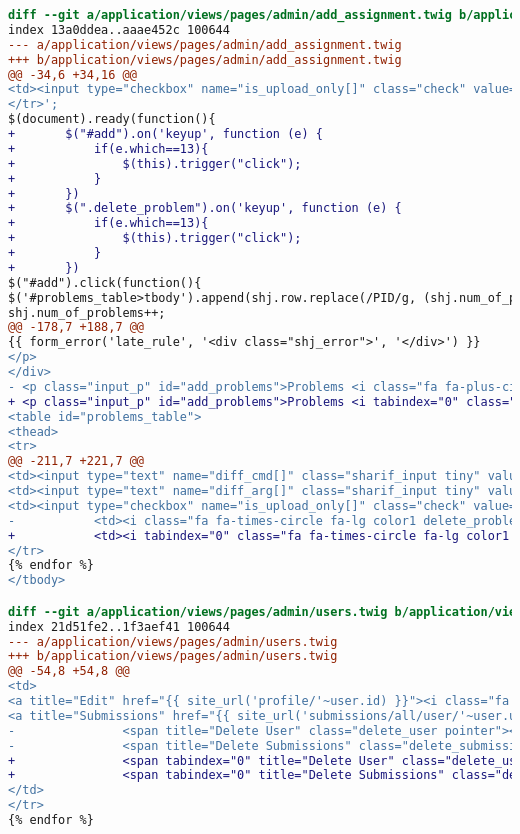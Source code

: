 \begin{itemize}
\begin{lstlisting}[language=diff, caption=Perubahan untuk mematuhi kriteria 2.1.1, label=lst_2.1.1, basicstyle=\ttfamily, frame=single,
columns=fullflexible, keepspaces=true, breaklines=true]
diff --git a/application/views/pages/admin/add_assignment.twig b/application/views/pages/admin/add_assignment.twig
index 13a0ddea..aaae452c 100644
--- a/application/views/pages/admin/add_assignment.twig
+++ b/application/views/pages/admin/add_assignment.twig
@@ -34,6 +34,16 @@
<td><input type="checkbox" name="is_upload_only[]" class="check" value="PID"/><td><i class="fa fa-times-circle fa-lg color1 delete_problem pointer"></i></td></td>\
</tr>';
$(document).ready(function(){
+ 		$("#add").on('keyup', function (e) {
+ 			if(e.which==13){
+ 				$(this).trigger("click");
+ 			}
+ 		})
+ 		$(".delete_problem").on('keyup', function (e) {
+ 			if(e.which==13){
+ 				$(this).trigger("click");
+ 			}
+ 		})
$("#add").click(function(){
$('#problems_table>tbody').append(shj.row.replace(/PID/g, (shj.num_of_problems+1)));
shj.num_of_problems++;
@@ -178,7 +188,7 @@
{{ form_error('late_rule', '<div class="shj_error">', '</div>') }}
</p>
</div>
- <p class="input_p" id="add_problems">Problems <i class="fa fa-plus-circle fa-lg color11 pointer" id="add"></i>
+ <p class="input_p" id="add_problems">Problems <i tabindex="0" class="fa fa-plus-circle fa-lg color11 pointer" id="add"></i>
<table id="problems_table">
<thead>
<tr>
@@ -211,7 +221,7 @@
<td><input type="text" name="diff_cmd[]" class="sharif_input tiny" value="{{ problem.diff_cmd }}"/></td>
<td><input type="text" name="diff_arg[]" class="sharif_input tiny" value="{{ problem.diff_arg }}"/></td>
<td><input type="checkbox" name="is_upload_only[]" class="check" value="{{ problem.id }}" {{ problem.is_upload_only ? 'checked' }}/></td>
- 			<td><i class="fa fa-times-circle fa-lg color1 delete_problem pointer"></i></td>
+ 			<td><i tabindex="0" class="fa fa-times-circle fa-lg color1 delete_problem pointer"></i></td>
</tr>
{% endfor %}
</tbody>

diff --git a/application/views/pages/admin/users.twig b/application/views/pages/admin/users.twig
index 21d51fe2..1f3aef41 100644
--- a/application/views/pages/admin/users.twig
+++ b/application/views/pages/admin/users.twig
@@ -54,8 +54,8 @@
<td>
<a title="Edit" href="{{ site_url('profile/'~user.id) }}"><i class="fa fa-pencil fa-lg color9"></i></a>
<a title="Submissions" href="{{ site_url('submissions/all/user/'~user.username) }}"><i class="fa fa-bars fa-lg color12"></i></a>
- 				<span title="Delete User" class="delete_user pointer"><i title="Delete User" class="fa fa-times fa-lg color2"></i></span>
- 				<span title="Delete Submissions" class="delete_submissions pointer"><i class="fa fa-times-circle fa-lg color1"></i></span>
+ 				<span tabindex="0" title="Delete User" class="delete_user pointer"><i title="Delete User" class="fa fa-times fa-lg color2"></i></span>
+ 				<span tabindex="0" title="Delete Submissions" class="delete_submissions pointer"><i class="fa fa-times-circle fa-lg color1"></i></span>
</td>
</tr>
{% endfor %}


\end{lstlisting}
\end{itemize}
